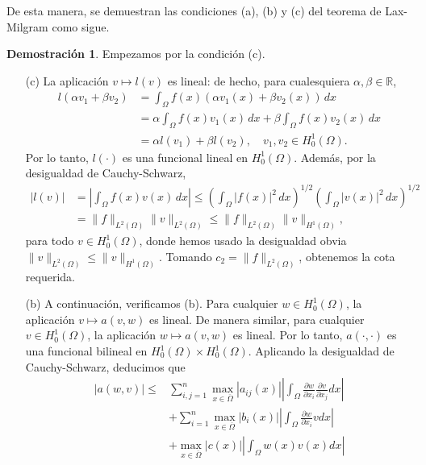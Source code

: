 \documentclass[a4paper,11pt,spanish, twoside, leqno]{tfg-uam}
\theoremstyle{definition}
\newtheorem{dem}[teor]{Demostración}
\begin{document}
De esta manera, se demuestran las condiciones (a), (b) y (c) del teorema de Lax-Milgram como sigue.
\begin{dem}
    Empezamos por la condición (c).
    \begin{itemize}
        \item[(c)] La aplicación $v \mapsto l(v)$ es lineal: de hecho, para cualesquiera $\alpha, \beta \in \mathbb{R}$, 
        \begin{align*}
            l(\alpha v_1 + \beta v_2) &= \int_{\Omega} f(x)(\alpha v_1(x) + \beta v_2(x)) \, dx \\
            &= \alpha \int_{\Omega} f(x)v_1(x) \, dx + \beta \int_{\Omega} f(x)v_2(x) \, dx \\
            &= \alpha l(v_1) + \beta l(v_2), \quad v_1, v_2 \in H_0^1(\Omega).
        \end{align*}
        Por lo tanto, $l(\cdot)$ es una funcional lineal en $H_0^1(\Omega)$. Además, por la desigualdad de Cauchy-Schwarz,
        \begin{align*}
            |l(v)| &= \left| \int_{\Omega} f(x)v(x) \, dx \right| \leq \left(\int_{\Omega} |f(x)|^2 \, dx \right)^{1/2} \left(\int_{\Omega} |v(x)|^2 \, dx \right)^{1/2} \\
            &= \|f\|_{L^2(\Omega)} \|v\|_{L^2(\Omega)} \leq \|f\|_{L^2(\Omega)} \|v\|_{H^1(\Omega)},
        \end{align*}
        para todo $v \in H_0^1(\Omega)$, donde hemos usado la desigualdad obvia $\|v\|_{L^2(\Omega)} \leq \|v\|_{H^1(\Omega)}$. Tomando $c_2 = \|f\|_{L^2(\Omega)}$, obtenemos la cota requerida.
        \item [(b)] A continuación, verificamos (b). Para cualquier $w \in H_0^1(\Omega)$, la aplicación $v \mapsto a(v, w)$ es lineal. De manera similar, para cualquier $v \in H_0^1(\Omega)$, la aplicación $w \mapsto a(v, w)$ es lineal. Por lo tanto, $a(\cdot, \cdot)$ es una funcional bilineal en $H_0^1(\Omega) \times H_0^1(\Omega)$. Aplicando la desigualdad de Cauchy-Schwarz, deducimos que
        \begin{align*}
            |a(w, v)| \leq & \sum_{i, j = 1}^n \max_{x \in \overline{\Omega}} |a_{ij}(x)|\left| \int_{\Omega}  \frac{\partial w}{\partial x_i} \frac{\partial v}{\partial x_j} dx \right|  \\
            &+ \sum_{i = 1}^n \max_{x \in \overline{\Omega}} |b_i(x)| \left|  \int_{\Omega} \frac{\partial w}{\partial x_i} v dx \right| \\
            &+ \max_{x \in \overline{\Omega}} |c(x)| \left| \int_{\Omega}  w(x)v(x) dx \right|  \\

\end{align*}
\end{itemize}
\end{dem}
\end{document}
